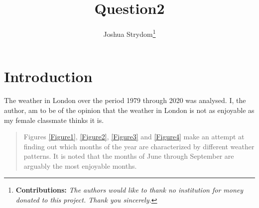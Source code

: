 \documentclass[11pt,preprint, authoryear]{elsarticle}
\numberwithin{equation}{section}
\numberwithin{figure}{section}
\numberwithin{table}{section}
\let\rmarkdownfootnote\footnote%
\def\footnote{\protect\rmarkdownfootnote}
\begin{document}
\begin{frontmatter}  %

\title{Question2}





\author[Add1]{Joshua Strydom\footnote{\textbf{Contributions:}
  \newline \emph{The authors would like to thank no institution for
  money donated to this project. Thank you sincerely.}}}





\address[Add1]{Stellenbosch University, Stellenbosch, South Africa}



\vspace{1cm}





\vspace{0.5cm}

\end{frontmatter}



\pagestyle{fancy}
\chead{}
\rhead{}
\lfoot{}
\lhead{}
\cfoot{}


\headsep 35pt %




\hypertarget{introduction}{%
\section{\texorpdfstring{Introduction
\label{Introduction}}{Introduction }}\label{introduction}}

The weather in London over the period 1979 through 2020 was analysed. I,
the author, am to be of the opinion that the weather in London is not as
enjoyable as my female classmate thinks it is.

\begin{quote}
Figures \ref{Figure1}, \ref{Figure2}, \ref{Figure3} and \ref{Figure4}
make an attempt at finding out which months of the year are
characterized by different weather patterns. It is noted that the months
of June through September are arguably the most enjoyable months.
\end{quote}
\end{document}
